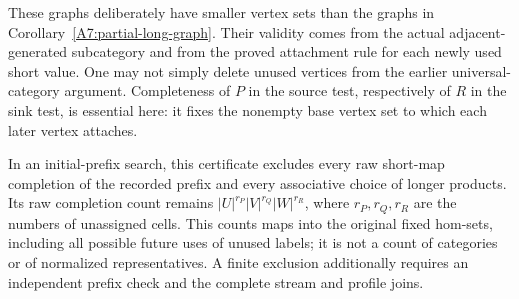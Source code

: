\begin{remark*}
These graphs deliberately have smaller vertex sets than the
graphs in Corollary~\ref{A7:partial-long-graph}.  Their validity
comes from the actual adjacent-generated subcategory and from
the proved attachment rule for each newly used short value.
One may not simply delete unused vertices from the earlier
universal-category argument.  Completeness of $P$ in the source
test, respectively of $R$ in the sink test, is essential here:
it fixes the nonempty base vertex set to which each later
vertex attaches.

In an initial-prefix search, this certificate excludes every
raw short-map completion of the recorded prefix and every
associative choice of longer products.  Its raw completion
count remains $|U|^{r_P}|V|^{r_Q}|W|^{r_R}$, where $r_P,r_Q,r_R$
are the numbers of unassigned cells.  This counts maps into
the original fixed hom-sets, including all possible future
uses of unused labels; it is not a count of categories or
of normalized representatives.  A finite exclusion additionally
requires an independent prefix check and the complete stream
and profile joins.
\end{remark*}
